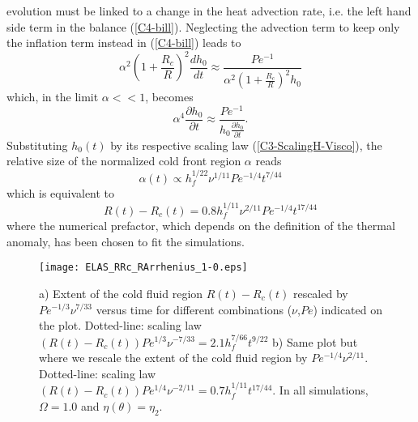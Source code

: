 evolution must be linked to a  change in the heat advection rate, i.e.
the left  hand side term  in the balance  (\ref{C4-bill}).  Neglecting
the  advection  term  to  keep  only the  inflation  term  instead  in
(\ref{C4-bill}) leads to
\begin{equation}
  \alpha^2\left(1+\frac{R_c}{R}\right)^2\frac{d h_0}{d
    t}\approx \frac{Pe^{-1}}{\alpha^2\left(1+\frac{R_c}{R}\right)^2h_0}
\end{equation}
which, in the limit $\alpha<<1$, becomes
\begin{equation}
  \alpha^4\frac{\partial h_0}{\partial
    t} \approx \frac{Pe^{-1}}{h_0\frac{\partial h_0}{\partial t}}.
\end{equation}
Substituting    $h_0(t)$    by     its    respective    scaling    law
(\ref{C3-ScalingH-Visco}), the  relative size  of the  normalized cold
front region $\alpha$ reads
\begin{equation}
  \alpha(t) \propto h_f^{1/22}\nu^{1/11}Pe^{-1/4}t^{7/44}
\end{equation}
which is equivalent to
\begin{equation}
  R(t)-R_c(t) = 0.8h_f^{1/11}\nu^{2/11}Pe^{-1/4}t^{17/44}
  \label{C4-ScalingRRc-Heating}
\end{equation}
where the numerical prefactor, which  depends on the definition of the
thermal anomaly, has been chosen to fit the simulations.

\begin{figure}
  \begin{center}
    \graphicspath{ {/Users/thorey/Documents/These/Projet/Refroidissement/Skin_Model/Figure/Figure_Heating/} }
    \texttt{[image: ELAS\_RRc\_RArrhenius\_1-0.eps]}
    \caption{a) Extent of the cold fluid region $R(t)-R_c(t)$ rescaled
      by $Pe^{-1/3}\nu^{7/33}$ versus  time for different combinations
      ($\nu$,$Pe$) indicated  on the  plot.  Dotted-line:  scaling law
      $(R(t)-R_c(t))Pe^{1/3}\nu^{-7/33}=  2.1  h_f^{7/66}t^{9/22}$  b)
      Same plot  but where  we rescale  the extent  of the  cold fluid
      region  by  $Pe^{-1/4}\nu^{2/11}$.    Dotted-line:  scaling  law
      $(R(t)-R_c(t))Pe^{1/4}\nu^{-2/11}= 0.7  h_f^{1/11}t^{17/44}$. In
      all simulations, $\Omega=1.0$ and $\eta(\theta)=\eta_2$.}
    \label{C4-ELAS_RRc_RArrhenius_1-0}
  \end{center}
\end{figure}

